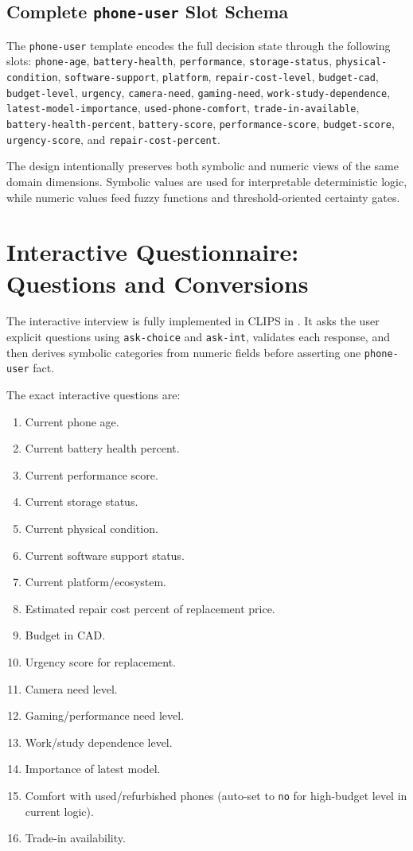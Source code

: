 \documentclass[11pt]{article}
\newcommand{\filepath}[1]{\path{#1}}
\begin{document}
\subsection{Complete \texttt{phone-user} Slot Schema}
The \texttt{phone-user} template encodes the full decision state through the following slots:
\texttt{phone-age}, \texttt{battery-health}, \texttt{performance}, \texttt{storage-status}, \texttt{physical-condition}, \texttt{software-support}, \texttt{platform}, \texttt{repair-cost-level}, \texttt{budget-cad}, \texttt{budget-level}, \texttt{urgency}, \texttt{camera-need}, \texttt{gaming-need}, \texttt{work-study-dependence}, \texttt{latest-model-importance}, \texttt{used-phone-comfort}, \texttt{trade-in-available}, \texttt{battery-health-percent}, \texttt{battery-score}, \texttt{performance-score}, \texttt{budget-score}, \texttt{urgency-score}, and \texttt{repair-cost-percent}.

The design intentionally preserves both symbolic and numeric views of the same domain dimensions. Symbolic values are used for interpretable deterministic logic, while numeric values feed fuzzy functions and threshold-oriented certainty gates.

\section{Interactive Questionnaire: Questions and Conversions}
The interactive interview is fully implemented in CLIPS in \filepath{sample-scenarios.clp}. It asks the user explicit questions using \texttt{ask-choice} and \texttt{ask-int}, validates each response, and then derives symbolic categories from numeric fields before asserting one \texttt{phone-user} fact.

The exact interactive questions are:
\begin{enumerate}
  \item Current phone age.
  \item Current battery health percent.
  \item Current performance score.
  \item Current storage status.
  \item Current physical condition.
  \item Current software support status.
  \item Current platform/ecosystem.
  \item Estimated repair cost percent of replacement price.
  \item Budget in CAD.
  \item Urgency score for replacement.
  \item Camera need level.
  \item Gaming/performance need level.
  \item Work/study dependence level.
  \item Importance of latest model.
  \item Comfort with used/refurbished phones (auto-set to \texttt{no} for high-budget level in current logic).
  \item Trade-in availability.
\end{enumerate}
\end{document}
